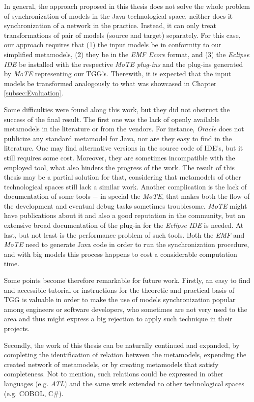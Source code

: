 \documentclass[tuberlin,cic,tc,english,noabntcite]{iiufrgs}
\begin{document}
In general, the approach proposed in this thesis does not solve the whole problem of synchronization of models in the Java technological space, neither does it synchronization of a network in the practice. Instead, it can only treat transformations of pair of models (source and target) separately. For this case, our approach requires that (1) the input models be in conformity to our simplified metamodels, (2) they be in the \emph{EMF Ecore} format, and (3) the \emph{Eclipse IDE} be installed with the respective \emph{MoTE plug-ins} and the plug-ins generated by \emph{MoTE} representing our TGG's. Therewith, it is expected that the input models be transformed analogously to what was showcased in Chapter \ref{subsec:Evaluation}.

Some difficulties were found along this work, but they did not obstruct the success of the final result. The first one was the lack of openly available metamodels in the literature or from the vendors. For instance, \emph{Oracle} does not publicize any standard metamodel for Java, nor are they easy to find in the literature. One may find alternative versions in the source code of IDE's, but it still requires some cost. Moreover, they are sometimes incompatible with the employed tool, what also hinders the progress of the work. The result of this thesis may be a partial solution for that, considering that metamodels of other technological spaces still lack a similar work. Another complication is the lack of documentation of some tools $-$ in special the \emph{MoTE}, that makes both the flow of the development and eventual debug tasks sometimes troublesome. \emph{MoTE} might have publications about it and also a good reputation in the community, but an extensive broad documentation of the plug-in for the \emph{Eclipse IDE} is needed. At last, but not least is the performance problem of such tools. Both the \emph{EMF} and \emph{MoTE} need to generate Java code in order to run the synchronization procedure, and with big models this process happens to cost a considerable computation time.

Some points become therefore remarkable for future work. Firstly, an easy to find and accessible tutorial or instructions for the theoretic and practical basis of TGG is valuable in order to make the use of models synchronization popular among engineers or software developers, who sometimes are not very used to the area and thus might express a big rejection to apply such technique in their projects.

Secondly, the work of this thesis can be naturally continued and expanded, by completing the identification of relation between the metamodels, expending the created network of metamodels, or by creating metamodels that satisfy completeness. Not to mention, such relations could be expressed in other languages (e.g. \emph{ATL}) and the same work extended to other technological spaces (e.g. COBOL, C\#).
\end{document}
